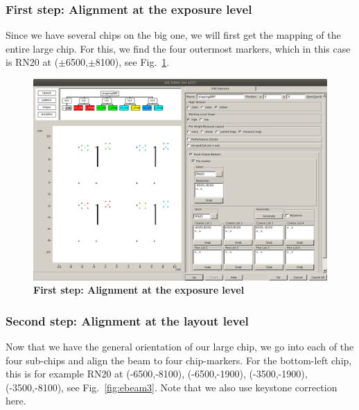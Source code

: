 \subsubsection{First step: Alignment at the exposure level}
%
Since we have several chips on the big one, we will first get the mapping of the entire large chip. 
%
For this, we find the four outermost markers, which in this case is RN20 at ($\pm$6500,$\pm$8100), see Fig.~\ref{fig:ebeam2}.

\begin{figure}
	\centering
	\includegraphics[width=\linewidth]{appendix/figs/ebeam2}
	\caption{\textbf{First step: Alignment at the exposure level}}
	\label{fig:ebeam2}
\end{figure}

\subsubsection{Second step: Alignment at the layout level}
%
Now that we have the general orientation of our large chip, we go into each of the four sub-chips and align the beam to four chip-markers. 
%
For the bottom-left chip, this is for example RN20 at (-6500,-8100), (-6500,-1900), (-3500,-1900), (-3500,-8100), see Fig.~\ref{fig:ebeam3}.
%
Note that we also use keystone correction here.

